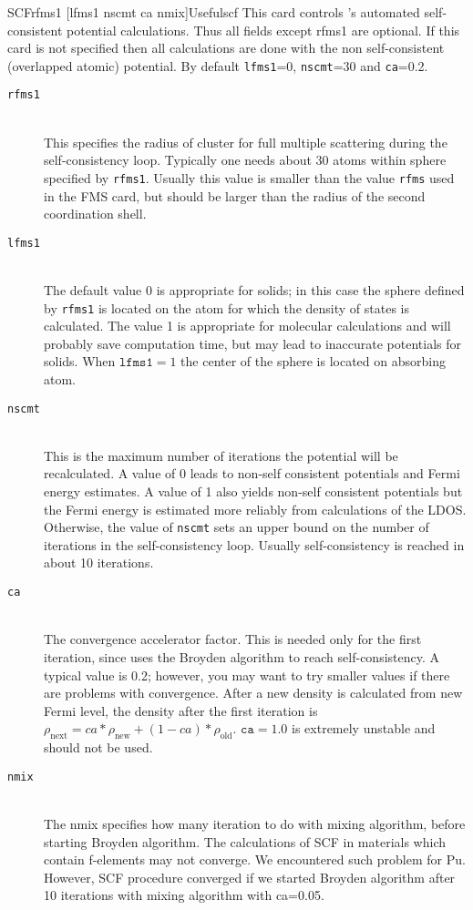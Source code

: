 \documentclass[11pt,oneside]{report} %
\begin{document}
\begin{Card}{SCF}{rfms1 [lfms1 nscmt ca nmix]}{Useful}{scf}
  This card controls {\feff}'s automated self-consistent potential
  calculations. Thus all fields except rfms1 are optional.
  If this card is not specified then all calculations are done with the
  non self-consistent (overlapped atomic) potential.
 By default \texttt{lfms1}=0, \texttt{nscmt}=30 and \texttt{ca}=0.2.
  \begin{description}
  \item[\texttt{rfms1}]\hfill\\ This specifies the radius of cluster
    for full multiple scattering during the self-consistency loop.
    Typically one needs about 30 atoms within sphere specified by
    \texttt{rfms1}. Usually this value is smaller than the value \texttt{rfms}
    used in the FMS card, but should be larger than the radius of
    the second coordination shell.
  \item[\texttt{lfms1}]\hfill\\ The default value 0 is appropriate for
    solids; in this case the sphere defined by \texttt{rfms1} is
    located on the atom for which the density of states is calculated.
    The value 1 is appropriate for molecular calculations and will
    probably save computation time, but may lead to inaccurate
    potentials for solids. When $\mathtt{lfms1} = 1$ the center of the
    sphere is located on absorbing atom.
  \item[\texttt{nscmt}]\hfill\\ This is the maximum number of iterations
    the potential will be recalculated.  A value of 0 leads to
    non-self consistent potentials and Fermi energy estimates.  A value of
    1 also yields non-self consistent potentials but the Fermi energy is
    estimated more reliably from calculations of the LDOS.
    Otherwise, the value of \texttt{nscmt} sets an
    upper bound on the number of iterations in the self-consistency
    loop.  Usually self-consistency is reached in about 10 iterations.
  \item[\texttt{ca}]\hfill\\ The convergence accelerator factor.  This
    is needed only for the first iteration, since {\feff} uses
    the Broyden algorithm to reach self-consistency. A typical value
    is 0.2; however, you may want to try smaller values if there are
    problems with convergence.  After a new density is calculated from
    new Fermi level, the density after the first iteration is
    $\rho_\mathrm{next} = ca*\rho_\mathrm{new} +
    (1-ca)*\rho_\mathrm{old}$.  $\mathtt{ca}=1.0$ is extremely unstable
    and should not be used.
  \item[\texttt{nmix}]\hfill\\ The nmix specifies how many iteration to do 
    with mixing algorithm, before starting Broyden algorithm.
    The calculations of SCF in materials
    which contain f-elements may not converge. We encountered such
    problem for Pu. However, SCF procedure converged if we started
    Broyden algorithm after 10 iterations with mixing algorithm with
    ca=0.05. 
  \end{description}


\end{Card}
\end{document}
